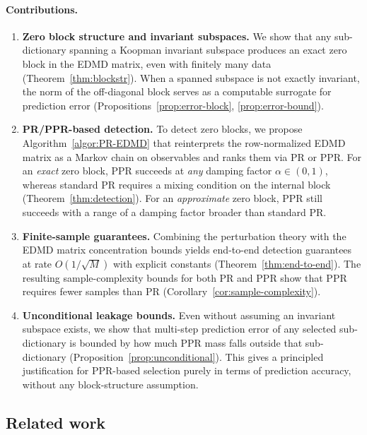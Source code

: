 \documentclass{article}
\theoremstyle{plain}
\theoremstyle{definition}
\begin{document}
	\paragraph{Contributions.}
	\begin{enumerate}[leftmargin=0.5cm]
		\item \textbf{Zero block structure and invariant subspaces.} We show that any sub-dictionary spanning a Koopman invariant subspace produces an exact zero block in the EDMD matrix, even with finitely many data (Theorem~\ref{thm:blockstr}). When a spanned subspace is not exactly invariant, the norm of the off-diagonal block serves as a computable surrogate for prediction error (Propositions~\ref{prop:error-block}, \ref{prop:error-bound}).
		\item \textbf{PR/PPR-based detection.} To detect zero blocks, we propose Algorithm~\ref{algor:PR-EDMD} that reinterprets the row-normalized EDMD matrix as a Markov chain on observables and ranks them via PR or PPR. For an \emph{exact} zero block, PPR succeeds at \emph{any} damping factor $\alpha \in (0,1)$, whereas standard PR requires a mixing condition on the internal block (Theorem~\ref{thm:detection}). 
		For an \emph{approximate} zero block, PPR still succeeds with a range of a damping factor broader than standard PR.
		\item \textbf{Finite-sample guarantees.} Combining the perturbation theory with the EDMD matrix concentration bounds yields end-to-end detection guarantees at rate $O(1/\sqrt{M})$ with explicit constants (Theorem~\ref{thm:end-to-end}). The resulting sample-complexity bounds for both PR and PPR show that PPR requires fewer samples than PR (Corollary~\ref{cor:sample-complexity}).
		\item \textbf{Unconditional leakage bounds.} 
		Even without assuming an invariant subspace exists, we show that multi-step prediction error of any selected sub-dictionary is bounded by how much PPR mass falls outside that sub-dictionary (Proposition~\ref{prop:unconditional}). This gives a principled justification for PPR-based selection purely in terms of prediction accuracy, without any block-structure assumption.  
	\end{enumerate}
	
	\subsection{Related work}\label{subsec:related}
	
\end{document}
